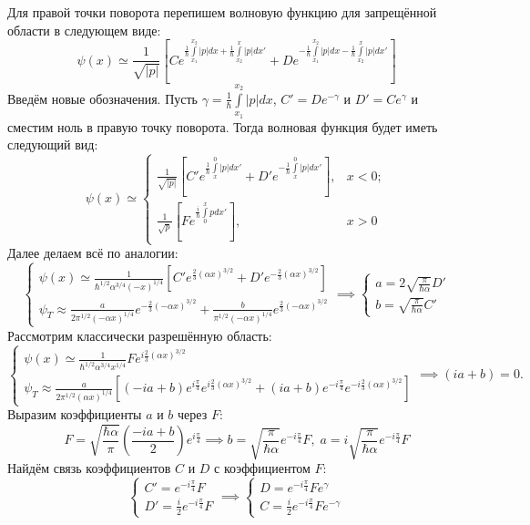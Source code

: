 Для правой точки поворота перепишем волновую функцию для запрещённой области в следующем виде:
\[
\psi(x) \simeq \frac{1}{\sqrt{|p|}} \left[ Ce^{\frac{1}{\hbar}\int\limits_{x_1}^{x_2} |p| dx + \frac{1}{\hbar}\int\limits_{x_2}^{x} |p| dx'} + De^{-\frac{1}{\hbar}\int\limits_{x_1}^{x_2} |p| dx - \frac{1}{\hbar}\int\limits_{x_2}^{x} |p| dx'} \right]
\]
Введём новые обозначения. Пусть $\gamma = \frac{1}{\hbar}\int\limits_{x_1}^{x_2} |p| dx$, $C' = De^{-\gamma}$ и $D' = Ce^{\gamma}$ и сместим ноль в правую точку поворота. Тогда волновая функция будет иметь следующий вид:
\[
   \psi(x) \simeq 
   \begin{cases}
   \frac{1}{\sqrt{|p|}}\left[ C'e^{\frac{1}{\hbar}\int\limits_{x}^{0} |p| dx'} + D'e^{-\frac{1}{\hbar}\int\limits_{x}^{0} |p| dx'} \right], & x < 0;\\
   \frac{1}{\sqrt{p}}\left[ Fe^{\frac{i}{\hbar}\int\limits_{0}^{x} p dx'} \right], & x > 0
   \end{cases}
\]
Далее делаем всё по аналогии:
\[
\begin{cases}
    \psi(x) \simeq \frac{1}{\hbar^{1/2}\alpha^{3/4}(-x)^{1/4}}\left[ C'e^{\frac{2}{3}(\alpha x)^{3/2}} + D'e^{-\frac{2}{3}(\alpha x)^{3/2}} \right]\\
    \psi_T \approx \frac{a}{2\pi^{1/2}(-\alpha x)^{1/4}}e^{-\frac{2}{3}(-\alpha x)^{3/2}} + \frac{b}{\pi^{1/2}(-\alpha x)^{1/4}}e^{\frac{2}{3}(-\alpha x)^{3/2}}
\end{cases}
 \implies
 \begin{cases}
     a = 2\sqrt{\frac{\pi}{\hbar\alpha}}D'\\
     b = \sqrt{\frac{\pi}{\hbar\alpha}}C'
 \end{cases}
\]
Рассмотрим классически разрешённую область:
\[
\begin{cases}
    \psi(x) \simeq \frac{1}{\hbar^{1/2}\alpha^{3/4}x^{1/4}}Fe^{i\frac{2}{3}(\alpha x)^{3/2}}\\
    \psi_T \approx \frac{a}{2\pi^{1/2}(\alpha x)^{1/4}}\left[ (-ia + b)e^{i\frac{\pi}{4}}e^{i\frac{2}{3}(\alpha x)^{3/2}} + (ia+b)e^{-i\frac{\pi}{4}}e^{-i\frac{2}{3}(\alpha x)^{3/2}} \right]
\end{cases}
 \implies (ia + b) = 0.
\]
Выразим коэффициенты $a$ и $b$ через $F$:
\[
F = \sqrt{\frac{\hbar\alpha}{\pi}}\left( \frac{-ia + b}{2} \right)e^{i\frac{\pi}{4}} \implies b = \sqrt{\frac{\pi}{\hbar\alpha}} e^{-i\frac{\pi}{4}}F, \; a = i\sqrt{\frac{\pi}{\hbar\alpha}} e^{-i\frac{\pi}{4}}F
\]
Найдём связь коэффициентов $C$ и $D$ с коэффициентом $F$:
\[
\begin{cases}
    C' = e^{-i\frac{\pi}{4}}F\\
    D' = \frac{i}{2}e^{-i\frac{\pi}{4}}F
\end{cases}
\implies
\begin{cases}
    D = e^{-i\frac{\pi}{4}}Fe^{\gamma}\\
    C = \frac{i}{2}e^{-i\frac{\pi}{4}}Fe^{-\gamma}
\end{cases}
\]
